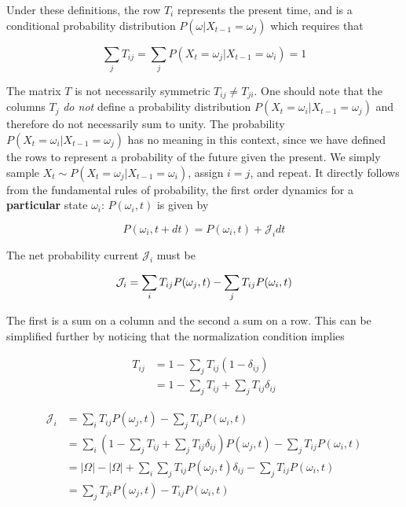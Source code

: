 \documentclass{ucetd}
\begin{document}
Under these definitions, the row $T_{i}$ represents the present time, and is a conditional  probability distribution $P(\omega | X_{t-1} = \omega_{j})$ which requires that

\begin{equation*}
\sum_{j}T_{ij} = \sum_{j} P(X_{t} = \omega_{j} | X_{t-1} = \omega_{i}) = 1
\end{equation*}

The matrix $T$ is not necessarily symmetric $T_{ij} \neq T_{ji}$. One should note that the columns $T_{j}$ \emph{do not} define a probability distribution $P(X_{t} = \omega_{i} | X_{t-1} = \omega_{j})$ and therefore do not necessarily sum to unity. The probability $P(X_{t} = \omega_{i} | X_{t-1} = \omega_{j})$ has no meaning in this context, since we have defined the rows to represent a probability of the future given the present. We simply sample $X_{t} \sim P(X_{t} = \omega_{j} | X_{t-1} = \omega_{i})$, assign $i=j$, and repeat. It directly follows from the fundamental rules of probability, the first order dynamics for a \textbf{particular} state $\omega_{i}$: $P(\omega_{i},t)$ is given by

\begin{equation}
P(\omega_{i},t+dt) = P(\omega_{i},t) + \mathcal{J}_{i}dt
\end{equation}

The net probability current $\mathcal{J}_{i}$ must be 

\begin{equation*}
\mathcal{J}_{i} = \sum_{i}T_{ij}P(\omega_{j},t) - \sum_{j}T_{ij}P(\omega_{i},t)\\
\end{equation*}

The first is a sum on a column and the second a sum on a row. This can be simplified further by noticing that the normalization condition implies

\begin{align*}
T_{ij} &= 1 - \sum_{j}T_{ij}(1-\delta_{ij})\\
&= 1 - \sum_{j}T_{ij} + \sum_{j}T_{ij}\delta_{ij}
\end{align*}


\begin{align*}
\mathcal{J}_{i} &= \sum_{i}T_{ij}P(\omega_{j},t) - \sum_{j}T_{ij}P(\omega_{i},t)\\
&= \sum_{i}\left(1 - \sum_{j}T_{ij} + \sum_{j}T_{ij}\delta_{ij}\right)P(\omega_{j},t) - \sum_{j}T_{ij}P(\omega_{i},t)\\
&= |\Omega| - |\Omega| + \sum_{i}\sum_{j}T_{ij}P(\omega_{j},t)\delta_{ij} - \sum_{j}T_{ij}P(\omega_{i},t)\\
&= \sum_{j}T_{ji}P(\omega_{j},t) - T_{ij}P(\omega_{i},t)\\
\end{align*}
\end{document}
